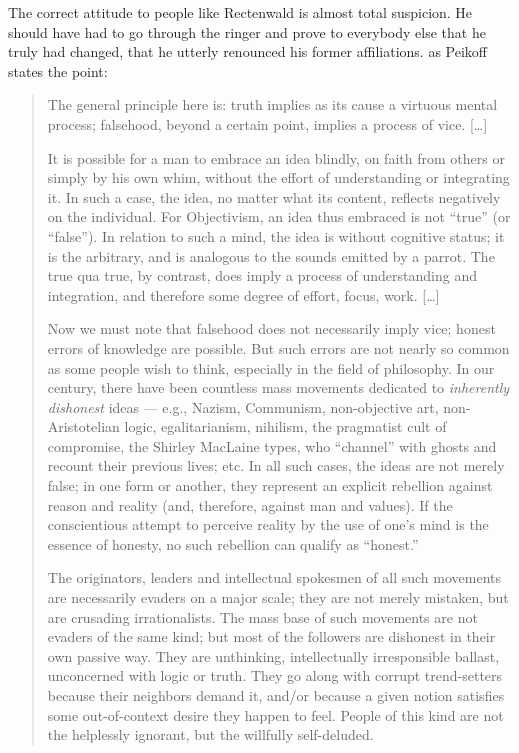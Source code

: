 \documentclass[11pt]{article}
\begin{document}
The correct attitude to people like Rectenwald is almost total suspicion. He should have had to go through the ringer and prove to everybody else that he truly had changed, that he utterly renounced his former affiliations. as Peikoff states the point:
\begin{quote}
The general principle here is: truth implies as its cause a virtuous mental process; falsehood, beyond a certain point, implies a process of vice. [\ldots{}]

It is possible for a man to embrace an idea blindly, on faith from others or simply by his own whim, without the effort of understanding or integrating it. In such a case, the idea, no matter what its content, reflects negatively on the individual. For Objectivism, an idea thus embraced is not “true” (or “false”). In relation to such a mind, the idea is without cognitive status; it is the arbitrary, and is analogous to the sounds emitted by a parrot. The true qua true, by contrast, does imply a process of understanding and integration, and therefore some degree of effort, focus, work. [\ldots{}]

Now we must note that falsehood does not necessarily imply vice; honest errors of knowledge are possible. But such errors are not nearly so common as some people wish to think, especially in the field of philosophy. In our century, there have been countless mass movements dedicated to \emph{inherently dishonest} ideas --- e.g., Nazism, Communism, non-objective art, non-Aristotelian logic, egalitarianism, nihilism, the pragmatist cult of compromise, the Shirley MacLaine types, who “channel” with ghosts and recount their previous lives; etc. In all such cases, the ideas are not merely false; in one form or another, they represent an explicit rebellion against reason and reality (and, therefore, against man and values). If the conscientious attempt to perceive reality by the use of one’s mind is the essence of honesty, no such rebellion can qualify as “honest.”

The originators, leaders and intellectual spokesmen of all such movements are necessarily evaders on a major scale; they are not merely mistaken, but are crusading irrationalists. The mass base of such movements are not evaders of the same kind; but most of the followers are dishonest in their own passive way. They are unthinking, intellectually irresponsible ballast, unconcerned with logic or truth. They go along with corrupt trend-setters because their neighbors demand it, and/or because a given notion satisfies some out-of-context desire they happen to feel. People of this kind are not the helplessly ignorant, but the willfully self-deluded.


\end{quote}
\end{document}
